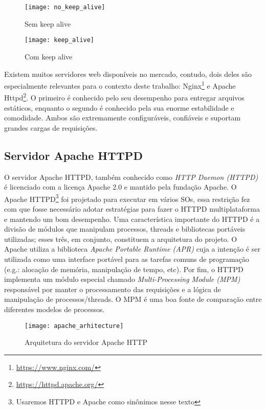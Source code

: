 \begin{figure}[!h]
  \centering
  \texttt{[image: no\_keep\_alive]}
  \caption{Sem keep alive}
  \label{fig:no_keep_alive}
\end{figure}

\begin{figure}[!h]
  \texttt{[image: keep\_alive]}
  \caption{Com keep alive}
  \label{fig:keep_alive}
\end{figure}

Existem muitos servidores web disponíveis no mercado, contudo, dois deles são
especialmente relevantes para o contexto deste trabalho:
Nginx\footnote{\url{https://www.nginx.com/}} e Apache
Httpd\footnote{\url{https://httpd.apache.org/}}.  O primeiro é conhecido pelo
seu desempenho para entregar arquivos estáticos, enquanto o segundo é conhecido
pela sua enorme estabilidade e comodidade. Ambos são extremamente
configuráveis, confiáveis e suportam grandes cargas de requisições.

\subsection{Servidor Apache HTTPD}
\label{sec:architecture}

O servidor Apache HTTPD, também conhecido como \textit{HTTP Daemon (HTTPD)} é
licenciado com a licença Apache 2.0 e mantido pela fundação Apache.  O Apache
HTTPD\footnote{Usaremos HTTPD e Apache como sinônimos nesse texto} foi
projetado para executar em vários SOs, essa restrição fez com que fosse
necessário adotar estratégias para fazer o HTTPD multiplataforma e mantendo um
bom desempenho.  Uma característica importante do HTTPD é a divisão de módulos
que manipulam processos, threads e bibliotecas portáveis utilizadas; esses
três, em conjunto, constituem a arquitetura do projeto. O Apache utiliza
a biblioteca \textit{Apache Portable Runtime (APR)} cuja a intenção é ser
utilizada como uma interface portável para as tarefas comuns de programação
(e.g.: alocação de memória, manipulação de tempo, etc). Por fim, o HTTPD
implementa um módulo especial chamado \textit{Multi-Processing Module (MPM)}
responsável por manter o processamento das requisições e a lógica de
manipulação de processos/threads. O MPM é uma boa fonte de comparação entre
diferentes modelos de processos.

\begin{figure}[!h]
  \centering
  \texttt{[image: apache\_arhitecture]} 
	\caption[Arquitetura do servidor Apache HTTP]{Arquitetura do servidor Apache HTTP \citep{apache_module_book}}
  \label{fig:apache_architecture} 
\end{figure}

